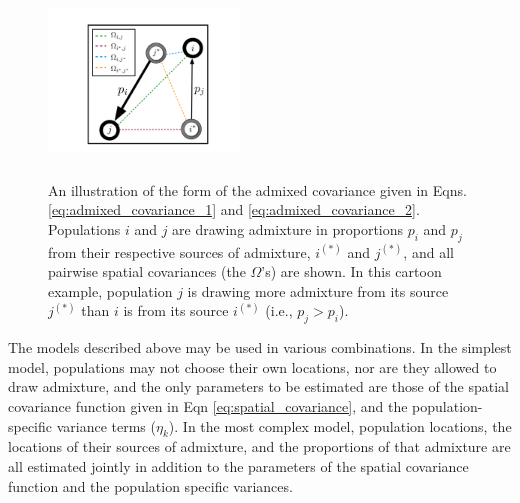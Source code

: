 \documentclass[12pt]{article}
\newcommand{\identifyadmixsource}[1]{{#1^{*}}}
\begin{document}
\begin{figure}[ht!]
	\centering
	\includegraphics[width=2in,height=2in]{figs/admix_cov_fig.pdf}
	\caption{An illustration of the form of the admixed covariance given in Eqns. \eqref{eq:admixed_covariance_1} and \eqref{eq:admixed_covariance_2}.  Populations $i$ and $j$ are drawing admixture in proportions $p_i$ and $p_j$ from their respective sources of admixture, $i^{(*)}$ and $j^{(*)}$, and all pairwise spatial covariances (the $\Omega$'s) are shown.  In this cartoon example, population $j$ is drawing more admixture from its source $j^{(*)}$ than $i$ is from its source $i^{(*)}$ (i.e., $p_j > p_i$).}\label{sfig:admixed_cov_diagram}
\end{figure}



The models described above may be used in various combinations.  In the simplest model, populations may not choose their own locations, nor are they allowed to draw admixture, and the only parameters to be estimated are those of the spatial covariance function given in Eqn \eqref{eq:spatial_covariance}, and the population-specific variance terms ($\eta_k$).  In the most complex model, population locations, the locations of their sources of admixture, and the proportions of that admixture are all estimated jointly in addition to the parameters of the spatial covariance function and the population specific variances.  %
\end{document}
